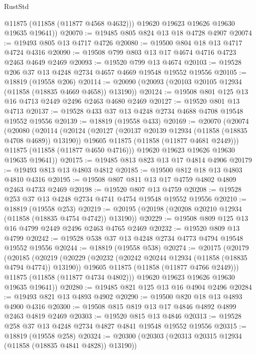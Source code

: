 \begin{lexlean}{RustStd}
\begin{coremodule}
          @11875
          (@11858 (@11877 @4568 @4632)))
        @19620
        @19623
        @19626
        @19630
        @19635
        @19641))
@20070 := @19485 @805 @824 @13 @18 @4728 @4907
@20074 := @19493 @805 @13 @4717 @4726
@20080 := @19500 @804 @18 @13 @4717 @4724 @4316
@20090 := @19508 @799 @803 @13 @17 @4674 @4716 @4723 @2463 @4649 @2469
@20093 := @19520 @799 @13 @4674
@20103 := @19528 @206 @37 @13 @4248 @2734 @4657 @4669 @19548 @19552 @19556
@20105 := @18819 (@19558 @206)
@20114 := @20090 (@20093 (@20103 @20105 @12934 (@11858 (@18835 @4669 @4658)) @13190))
@20124 := @19508 @801 @125 @13 @16 @4713 @2449 @2496 @2463 @4680 @2469
@20127 := @19520 @801 @13 @4713
@20137 := @19528 @433 @37 @13 @4248 @2734 @4688 @4708 @19548 @19552 @19556
@20139 := @18819 (@19558 @433)
@20169 := @20070
    (@20074
      (@20080
        (@20114
          (@20124
            (@20127 (@20137 @20139 @12934 (@11858 (@18835 @4708 @4689)) @13190))
            @19605
            @11875
            (@11858 (@11877 @4681 @2449)))
          @11875
          (@11858 (@11877 @4650 @4716)))
        @19620
        @19623
        @19626
        @19630
        @19635
        @19641))
@20175 := @19485 @813 @823 @13 @17 @4814 @4906
@20179 := @19493 @813 @13 @4803 @4812
@20185 := @19500 @812 @18 @13 @4803 @4810 @4316
@20195 := @19508 @807 @811 @13 @17 @4759 @4802 @4809 @2463 @4733 @2469
@20198 := @19520 @807 @13 @4759
@20208 := @19528 @253 @37 @13 @4248 @2734 @4741 @4754 @19548 @19552 @19556
@20210 := @18819 (@19558 @253)
@20219 := @20195 (@20198 (@20208 @20210 @12934 (@11858 (@18835 @4754 @4742)) @13190))
@20229 := @19508 @809 @125 @13 @16 @4799 @2449 @2496 @2463 @4765 @2469
@20232 := @19520 @809 @13 @4799
@20242 := @19528 @538 @37 @13 @4248 @2734 @4773 @4794 @19548 @19552 @19556
@20244 := @18819 (@19558 @538)
@20274 := @20175
    (@20179
      (@20185
        (@20219
          (@20229
            (@20232 (@20242 @20244 @12934 (@11858 (@18835 @4794 @4774)) @13190))
            @19605
            @11875
            (@11858 (@11877 @4766 @2449)))
          @11875
          (@11858 (@11877 @4734 @4802)))
        @19620
        @19623
        @19626
        @19630
        @19635
        @19641))
@20280 := @19485 @821 @125 @13 @16 @4904 @2496
@20284 := @19493 @821 @13 @4893 @4902
@20290 := @19500 @820 @18 @13 @4893 @4900 @4316
@20300 := @19508 @815 @819 @13 @17 @4846 @4892 @4899 @2463 @4819 @2469
@20303 := @19520 @815 @13 @4846
@20313 := @19528 @258 @37 @13 @4248 @2734 @4827 @4841 @19548 @19552 @19556
@20315 := @18819 (@19558 @258)
@20324 := @20300 (@20303 (@20313 @20315 @12934 (@11858 (@18835 @4841 @4828)) @13190))

\end{coremodule}
\end{lexlean}
